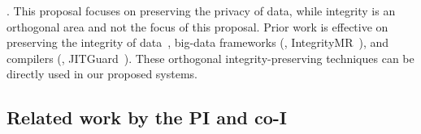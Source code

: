 
. This proposal focuses on preserving the 
privacy of data, while integrity is an orthogonal area and not the focus 
of this proposal. Prior work is effective on preserving the integrity of 
data~\cite{wang2015panda}, big-data frameworks 
(\eg, IntegrityMR~\cite{wang2013integritymr}), and compilers 
(\eg, JITGuard~\cite{jitguard:ccs17}). These orthogonal integrity-preserving 
techniques can be directly used in our proposed systems.







\vspace{-.15in}\subsection{Related work by the PI and co-I} 
\label{sec:my-work}\vspace{-.075in}
% 

